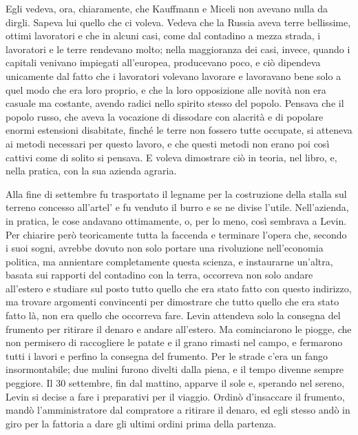 Egli vedeva, ora, chiaramente, che Kauffmann e Miceli non avevano nulla da dirgli. Sapeva lui quello che ci voleva. Vedeva che la Russia aveva terre bellissime, ottimi lavoratori e che in alcuni casi, come dal contadino a mezza strada, i lavoratori e le terre rendevano molto; nella maggioranza dei casi, invece, quando i capitali venivano impiegati all'europea, producevano poco, e ciò dipendeva unicamente dal fatto che i lavoratori volevano lavorare e lavoravano bene solo a quel modo che era loro proprio, e che la loro opposizione alle novità non era casuale ma costante, avendo radici nello spirito stesso del popolo. Pensava che il popolo russo, che aveva la vocazione di dissodare con alacrità e di popolare enormi estensioni disabitate, finché le terre non fossero tutte occupate, si atteneva ai metodi necessari per questo lavoro, e che questi metodi non erano poi così cattivi come di solito si pensava. E voleva dimostrare ciò in teoria, nel libro, e, nella pratica, con la sua azienda agraria. 

\label{xxx-2} 

Alla fine di settembre fu trasportato il legname per la costruzione della stalla sul terreno concesso all'artel' e fu venduto il burro e se ne divise l'utile. Nell'azienda, in pratica, le cose andavano ottimamente, o, per lo meno, così sembrava a Levin. Per chiarire però teoricamente tutta la faccenda e terminare l'opera che, secondo i suoi sogni, avrebbe dovuto non solo portare una rivoluzione nell'economia politica, ma annientare completamente questa scienza, e instaurarne un'altra, basata sui rapporti del contadino con la terra, occorreva non solo andare all'estero e studiare sul posto tutto quello che era stato fatto con questo indirizzo, ma trovare argomenti convincenti per dimostrare che tutto quello che era stato fatto là, non era quello che occorreva fare. Levin attendeva solo la consegna del frumento per ritirare il denaro e andare all'estero. Ma cominciarono le piogge, che non permisero di raccogliere le patate e il grano rimasti nel campo, e fermarono tutti i lavori e perfino la consegna del frumento. Per le strade c'era un fango insormontabile; due mulini furono divelti dalla piena, e il tempo divenne sempre peggiore. Il 30 settembre, fin dal mattino, apparve il sole e, sperando nel sereno, Levin si decise a fare i preparativi per il viaggio. Ordinò d'insaccare il frumento, mandò l'amministratore dal compratore a ritirare il denaro, ed egli stesso andò in giro per la fattoria a dare gli ultimi ordini prima della partenza. 

